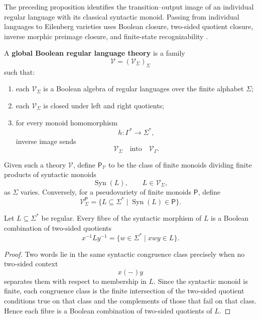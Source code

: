 The preceding proposition identifies the transition--output image of an
individual regular language with its classical syntactic monoid. Passing from
individual languages to Eilenberg varieties uses Boolean closure, two-sided
quotient closure, inverse morphic preimage closure, and finite-state
recognizability
\cite{Eilenberg1974}.

\begin{definition}
\label{def:to-global-boolean-regular-language-theory}
    A \textbf{global Boolean regular language theory} is a family
    \[
        \mathcal V=(\mathcal V_\Sigma)_\Sigma
    \]
    such that:
    \begin{enumerate}
        \item each \(\mathcal V_\Sigma\) is a Boolean algebra of regular
        languages over the finite alphabet \(\Sigma\);
        \item each \(\mathcal V_\Sigma\) is closed under left and right
        quotients;
        \item for every monoid homomorphism
        \[
            h:\Gamma^*\to\Sigma^*,
        \]
        inverse image sends
        \[
            \mathcal V_\Sigma
            \quad\text{into}\quad
            \mathcal V_\Gamma.
        \]
    \end{enumerate}
\end{definition}

Given such a theory \(\mathcal V\), define \(\mathsf P_{\mathcal V}\) to be
the class of finite monoids dividing finite products of syntactic monoids
\[
    \operatorname{Syn}(L),
    \qquad
    L\in\mathcal V_\Sigma,
\]
as \(\Sigma\) varies. Conversely, for a pseudovariety of finite monoids
\(\mathsf P\), define
\[
    \mathcal V^{\mathsf P}_\Sigma
    =
    \{L\subseteq\Sigma^*
      \mid
      \operatorname{Syn}(L)\in\mathsf P\}.
\]

\begin{lemma}
\label{lem:to-syntactic-separation}
    Let \(L\subseteq\Sigma^*\) be regular. Every fibre of the syntactic
    morphism of \(L\) is a Boolean combination of two-sided quotients
    \[
        x^{-1}Ly^{-1}
        =
        \{w\in\Sigma^*\mid xwy\in L\}.
    \]
\end{lemma}

\begin{proof}
    Two words lie in the same syntactic congruence class precisely when no
    two-sided context
    \[
        x(-)y
    \]
    separates them with respect to membership in \(L\). Since the syntactic
    monoid is finite, each congruence class is the finite intersection of the
    two-sided quotient conditions true on that class and the complements of
    those that fail on that class. Hence each fibre is a Boolean combination of
    two-sided quotients of \(L\).
\end{proof}

